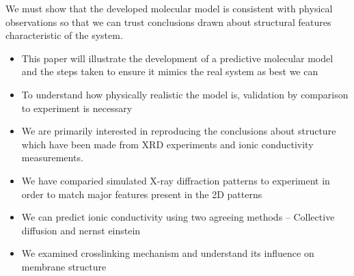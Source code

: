 We must show that the developed molecular model is consistent with physical observations so that we can trust conclusions drawn about structural features characteristic of the system.
\begin{itemize}
	\item This paper will illustrate the development of a predictive molecular model and the steps taken to ensure it mimics the real system as best we can 
	\item To understand how physically realistic the model is, validation by comparison to experiment is necessary
	\item We are primarily interested in reproducing the conclusions about structure which have been made from XRD experiments and ionic conductivity measurements.    
	\item We have comparied simulated X-ray diffraction patterns to experiment in order to match major features present in the 2D patterns
	\item We can predict ionic conductivity using two agreeing methods -- Collective diffusion and nernst einstein
	\item We examined crosslinking mechanism and understand its influence on membrane structure
\end{itemize}
	

